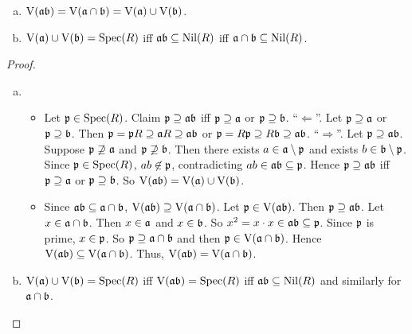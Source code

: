 \begin{proposition}
    \begin{enumerate}[(a)]
        \item 
            $\operatorname{V}(\mathfrak{a} \mathfrak{b}) = \operatorname{V}(\mathfrak{a} \cap \mathfrak{b}) = \operatorname{V}(\mathfrak{a}) \cup \operatorname{V}(\mathfrak{b})$.
        \item 
            $\operatorname{V}(\mathfrak{a}) \cup \operatorname{V}(\mathfrak{b}) = \operatorname{Spec}(R)$ iff $\mathfrak{a} \mathfrak{b} \subseteq \operatorname{Nil}(R)$ iff $\mathfrak{a} \cap \mathfrak{b} \subseteq \operatorname{Nil}(R)$.
    \end{enumerate}
\end{proposition}

\begin{proof}
    \begin{enumerate}[(a)]
        \item 
            \begin{itemize}
                \item 
                    Let $\mathfrak{p} \in \operatorname{Spec}(R)$. Claim $\mathfrak{p} \supseteq \mathfrak{a} \mathfrak{b}$ iff $\mathfrak{p} \supseteq \mathfrak{a}$ or $\mathfrak{p} \supseteq \mathfrak{b}$. ``$\Leftarrow$''. Let $\mathfrak{p} \supseteq \mathfrak{a}$ or $\mathfrak{p} \supseteq \mathfrak{b}$. Then $\mathfrak{p} = \mathfrak{p} R \supseteq \mathfrak{a} R \supseteq \mathfrak{a}\mathfrak{b}$ or $\mathfrak{p}  = R  \mathfrak{p} \supseteq R\mathfrak{b} \supseteq \mathfrak{a}\mathfrak{b}$. ``$\Rightarrow$''. Let $\mathfrak{p} \supseteq \mathfrak{a} \mathfrak{b}$. Suppose $\mathfrak{p} \not \supseteq \mathfrak{a}$ and $\mathfrak{p} \not \supseteq \mathfrak{b}$. Then there exists $a \in \mathfrak{a} \setminus \mathfrak{p}$ and exists $b \in \mathfrak{b} \setminus \mathfrak{p}$. Since $\mathfrak{p} \in \operatorname{Spec}(R)$, $ab \not \in \mathfrak{p}$, contradicting $ab \in \mathfrak{a} \mathfrak{b} \subseteq \mathfrak{p}$. Hence $\mathfrak{p} \supseteq \mathfrak{a} \mathfrak{b}$ iff $\mathfrak{p} \supseteq \mathfrak{a}$ or $\mathfrak{p} \supseteq \mathfrak{b}$. So $\operatorname{V}(\mathfrak{a} \mathfrak{b}) = \operatorname{V}(\mathfrak{a}) \cup \operatorname{V}(\mathfrak{b})$. \\
                \item 
                    Since $\mathfrak{a} \mathfrak{b} \subseteq \mathfrak{a} \cap \mathfrak{b}$, $\operatorname{V}(\mathfrak{a} \mathfrak{b}) \supseteq \operatorname{V}(\mathfrak{a} \cap \mathfrak{b})$. Let $\mathfrak{p} \in \operatorname{V}(\mathfrak{a} \mathfrak{b})$. Then $\mathfrak{p} \supseteq \mathfrak{a} \mathfrak{b}$. Let $x \in \mathfrak{a} \cap \mathfrak{b}$. Then $x \in \mathfrak{a}$ and $x \in \mathfrak{b}$. So $x^2 = x \cdot x \in \mathfrak{a} \mathfrak{b} \subseteq \mathfrak{p}$. Since $\mathfrak{p}$ is prime, $x \in \mathfrak{p}$. So $\mathfrak{p} \supseteq \mathfrak{a} \cap \mathfrak{b}$ and then $\mathfrak{p} \in \operatorname{V}(\mathfrak{a} \cap \mathfrak{b})$. Hence $\operatorname{V}(\mathfrak{a} \mathfrak{b}) \subseteq \operatorname{V}(\mathfrak{a} \cap \mathfrak{b})$. Thus, $\operatorname{V}(\mathfrak{a} \mathfrak{b}) = \operatorname{V}(\mathfrak{a} \cap \mathfrak{b})$.
            \end{itemize}
        \item $\operatorname{V}(\mathfrak{a}) \cup \operatorname{V}(\mathfrak{b}) = \operatorname{Spec}(R)$ iff $\operatorname{V}(\mathfrak{a} \mathfrak{b}) = \operatorname{Spec}(R)$ iff $\mathfrak{a}\mathfrak{b} \subseteq \operatorname{Nil}(R)$ and similarly for $\mathfrak{a} \cap \mathfrak{b}$.
    \end{enumerate}
\end{proof}


